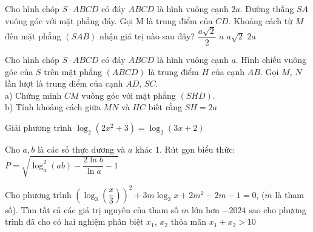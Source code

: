\begin{ex}
	Cho hình chóp $S \cdot ABCD$ có đáy $ABCD$ là hình vuông cạnh $2a$. Đường thẳng $SA$ vuông góc với mặt phẳng đáy. Gọi M là trung điểm của $CD$. Khoảng cách từ $M$ đến mặt phẳng $(SAB)$ nhận giá trị nào sau đây?
	\choice
	{$\dfrac{a\sqrt{2}}{2}$}
	{$a$}
	{$a\sqrt{2}$}
	{$2a$}
\end{ex}
\begin{ex}
	Cho hình chóp $S \cdot ABCD$ có đáy $ABCD$ là hình vuông cạnh $a$. Hình chiếu vuông góc của $S$ trên mặt phẳng $(ABCD)$ là trung điểm $H$ của cạnh $AB$. Gọi $M$, $N$ lần lượt là trung điểm của cạnh $AD$, $SC$.\\
	a) Chứng minh $CM$ vuông góc với mặt phẳng $(SHD)$.\\
	b) Tính khoảng cách giữa $MN$ và $HC$ biết rằng $SH=2a$
	\end{ex}
\begin{ex}
Giải phương trình $\log _2\left(2x^2+3\right)=\log _2(3x+2)$
\end{ex}
\begin{ex}
Cho $a,b$ là các số thực dương và $a$ khác $1$. Rút gọn biểu thức:$P=\sqrt{\log _a^2(ab)-\dfrac{2\ln b}{\ln a}-1}$
\end{ex}
\begin{ex}
Cho phương trình $\left(\log _3\left(\dfrac{x}{3}\right)\right)^2+3 m \log _3 x+2 m^2-2 m-1=0$, ($m$ là tham số). Tìm tất cả các giá trị nguyên của tham số $m$ lớn hơn $-2024$ sao cho phương trình đã cho có hai nghiệm phân biệt $x_1$, $x_2$ thỏa mãn $x_1+x_2>10$
\end{ex}
